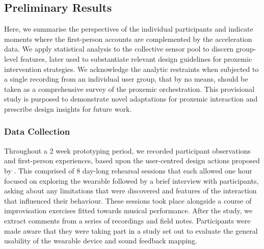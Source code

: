 
\subsection{Preliminary Results}
\label{sec:results}

Here, we summarise the perspectives of the individual participants and indicate moments where the first-person accounts are complemented by the acceleration data. We apply statistical analysis to the collective sensor pool to discern group-level features, later used to substantiate relevant design guidelines for proxemic intervention strategies. We acknowledge the analytic restraints when subjected to a single recording from an individual user group, that by no means, should be taken as a comprehensive survey of the proxemic orchestration. This provisional study is purposed to demonstrate novel adaptations for proxemic interaction and prescribe design insights for future work.


\subsubsection{Data Collection}
\label{sec:data_collection}

Throughout a 2 week prototyping period, we recorded participant observations and first-person experiences, based upon the user-centred design actions proposed by \citeauthor{bernardo_user-centred_2018} \cite{bernardo_user-centred_2018}. This comprised of 8 day-long rehearsal sessions that each allowed one hour focused on exploring the wearable followed by a brief interview with participants, asking about any limitations that were discovered and features of the interaction that influenced their behaviour. These sessions took place alongside a course of improvisation exercises fitted towards musical performance. After the study, we extract comments from a series of recordings and field notes. Participants were made aware that they were taking part in a study set out to evaluate the general usability of the wearable device and sound feedback mapping.

